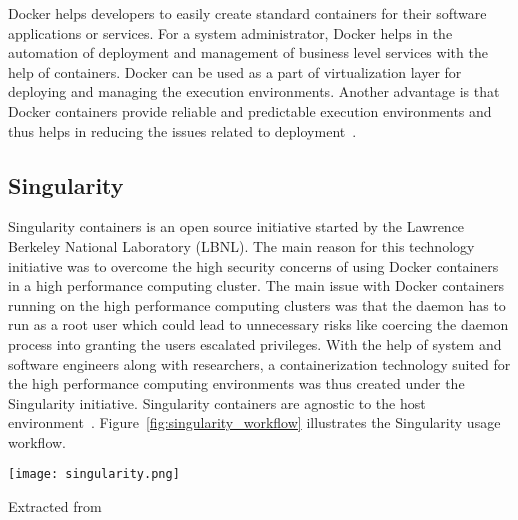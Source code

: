 Docker helps developers to easily create standard containers for their software applications or services. For a system administrator, Docker helps in the automation of deployment and management of business level services with the help of containers. Docker can be used as a part of virtualization layer for deploying and managing the execution environments. Another advantage is that Docker containers provide reliable and predictable execution environments and thus helps in reducing the issues related to deployment~\cite{DBLP:journals/corr/MorrisVHM17}.

\subsection{Singularity}
Singularity containers is an open source initiative started by the Lawrence Berkeley National Laboratory (LBNL). The main reason for this technology initiative was to overcome the high security concerns of using Docker containers in a high performance computing cluster. The main issue with Docker containers running on the high performance computing clusters was that the daemon has to run as a root user which could lead to unnecessary risks like coercing the daemon process into granting the users escalated privileges. With the help of system and software engineers along with researchers, a containerization technology suited for the high performance computing environments was thus created under the Singularity initiative. Singularity containers are agnostic to the host environment~\cite{10.1371/journal.pone.0177459}. Figure~\ref{fig:singularity_workflow} illustrates the Singularity usage workflow.

\begin{center}
\texttt{[image: singularity.png]}
\label{fig:singularity_workflow}
\caption*{Extracted from \cite{10.1371/journal.pone.0177459}}
\end{center}

